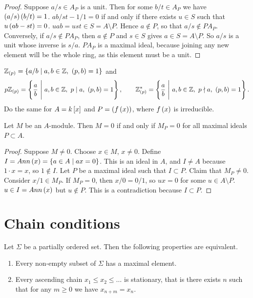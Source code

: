 \begin{proof}
Suppose $ a / s \in A_P $ is a unit. Then for some $ b / t \in A_P $ we have $ \rb{a / s}\rb{b / t} = 1 $. $ ab / st - 1 / 1 = 0 $ if and only if there exists $ u \in S $ such that $ u\rb{ab - st} = 0 $. $ uab = ust \in S = A \setminus P $. Hence $ a \notin P $, so that $ a / s \notin PA_P $. Conversely, if $ a / s \notin PA_P $, then $ a \notin P $ and $ s \in S $ gives $ a \in S = A \setminus P $. So $ a / s $ is a unit whose inverse is $ s / a $. $ PA_P $ is a maximal ideal, because joining any new element will be the whole ring, as this element must be a unit.
\end{proof}

\begin{example*}
$ \Z_{\rb{p}} = \cb{a / b \mid a, b \in \Z, \ \rb{p, b} = 1} $ and
$$ p\Z_{\rb{p}} = \cb{\dfrac{a}{b} \ \Bigg| \ a, b \in \Z, \ p \mid a, \ \rb{p, b} = 1}, \qquad \Z_{\rb{p}}^* = \cb{\dfrac{a}{b} \ \Bigg| \ a, b \in \Z, \ p \nmid a, \ \rb{p, b} = 1}. $$
Do the same for $ A = k\sb{x} $ and $ P = \rb{f\rb{x}} $, where $ f\rb{x} $ is irreducible.
\end{example*}

\begin{proposition}
Let $ M $ be an $ A $-module. Then $ M = 0 $ if and only if $ M_P = 0 $ for all maximal ideals $ P \subset A $.
\end{proposition}

\begin{proof}
Suppose $ M \ne 0 $. Choose $ x \in M $, $ x \ne 0 $. Define $ I = Ann\rb{x} = \cb{a \in A \mid ax = 0} $. This is an ideal in $ A $, and $ I \ne A $ because $ 1 \cdot x = x $, so $ 1 \notin I $. Let $ P $ be a maximal ideal such that $ I \subset P $. Claim that $ M_P \ne 0 $. Consider $ x / 1 \in M_P $. If $ M_P = 0 $, then $ x / 0 = 0 / 1 $, so $ ux = 0 $ for some $ u \in A \setminus P $. $ u \in I = Ann\rb{x} $ but $ u \notin P $. This is a contradiction because $ I \subset P $.
\end{proof}

\pagebreak

\section{Chain conditions}


\begin{lemma}
Let $ \Sigma $ be a partially ordered set. Then the following properties are equivalent.
\begin{enumerate}
\item Every non-empty subset of $ \Sigma $ has a maximal element.
\item Every ascending chain $ x_1 \le x_2 \le \dots $ is stationary, that is there exists $ n $ such that for any $ m \ge 0 $ we have $ x_{n + m} = x_n $.
\end{enumerate}
\end{lemma}

